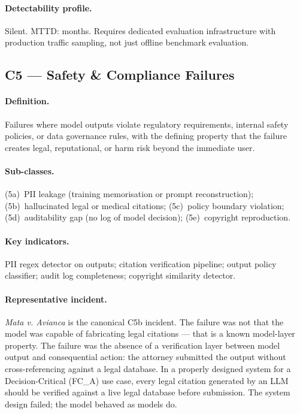 \documentclass{article}
\begin{document}
\paragraph{Detectability profile.}
Silent.  MTTD: months.  Requires dedicated evaluation infrastructure with
production traffic sampling, not just offline benchmark evaluation.

\subsection{C5 --- Safety \& Compliance Failures}

\paragraph{Definition.}
Failures where model outputs violate regulatory requirements, internal safety
policies, or data governance rules, with the defining property that the failure
creates legal, reputational, or harm risk beyond the immediate user.

\paragraph{Sub-classes.}
(5a)~PII leakage (training memorisation or prompt reconstruction);
(5b)~hallucinated legal or medical citations; (5c)~policy boundary violation;
(5d)~auditability gap (no log of model decision); (5e)~copyright reproduction.

\paragraph{Key indicators.}
PII regex detector on outputs; citation verification pipeline; output
policy classifier; audit log completeness; copyright similarity detector.

\paragraph{Representative incident.}
\emph{Mata v. Avianca} \citep{mata2023avianca} is the canonical C5b incident.
The failure was not that the model was capable of fabricating legal citations ---
that is a known model-layer property.  The failure was the absence of a
verification layer between model output and consequential action: the attorney
submitted the output without cross-referencing against a legal database.
In a properly designed system for a Decision-Critical (FC\_A) use case,
every legal citation generated by an LLM should be verified against a live
legal database before submission.  The system design failed; the model
behaved as models do.
\end{document}
